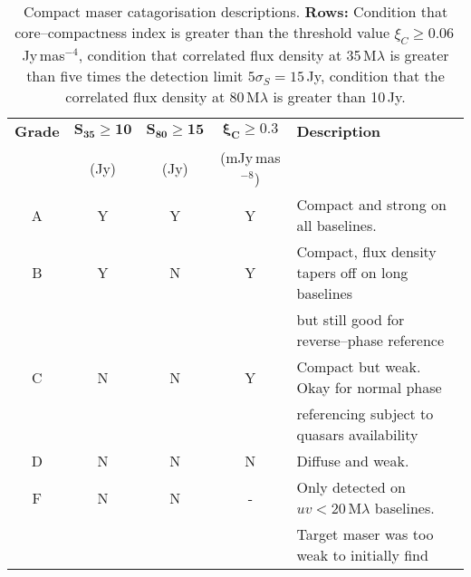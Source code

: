         \begin{table}[H]
            \centering
            \caption[Compact maser catagorisation descriptions]{Compact maser catagorisation descriptions. {\bf Rows:} Condition that core--compactness index is greater than the threshold value $\xi_C\ge0.06$\,Jy\,mas$^{-4}$, condition that correlated flux density at 35\,M$\lambda$ is greater than five times the detection limit $5\sigma_S=15$\,Jy, condition that the correlated flux density at 80\,M$\lambda$ is greater than 10\,Jy.} %
            \label{tab:catagorisation_table}
            {\onehalfspacing \small 
            \begin{tabular}{ccccl}
                \toprule
                {\bf Grade}&$\boldsymbol{S_{35}\ge10}$&$\boldsymbol{S_{80}\ge15}$&$\boldsymbol{\xi_C\ge0.3} $&{\bf Description}                   \\ 
                           &(Jy)                      &(Jy)                      &(mJy\,mas$^{-8}$)          &                                    \\\midrule
                 A         &   Y                      &   Y                      &                       Y   &Compact and strong on all baselines.\\\hdashline
                 B         &   Y                      &   N                      &                       Y   &Compact, flux density tapers off on long baselines\\
                           &                          &                          &                           &but still good for reverse--phase reference \\\hdashline
                 C         &   N                      &   N                      &                       Y   &Compact but weak. Okay for normal phase \\
		                   & 						  & 						 &							 &referencing subject to quasars availability\\\hdashline
                 D         &   N                      &   N                      &                       N   &Diffuse and weak.  \\\hdashline
                 F         &   N                      &   N                      &                       -   &Only detected on $uv<20$\,M$\lambda$ baselines. \\
                           &                          &                          &                           &Target maser was too weak to initially  find \\

\end{tabular}}
\end{table}
